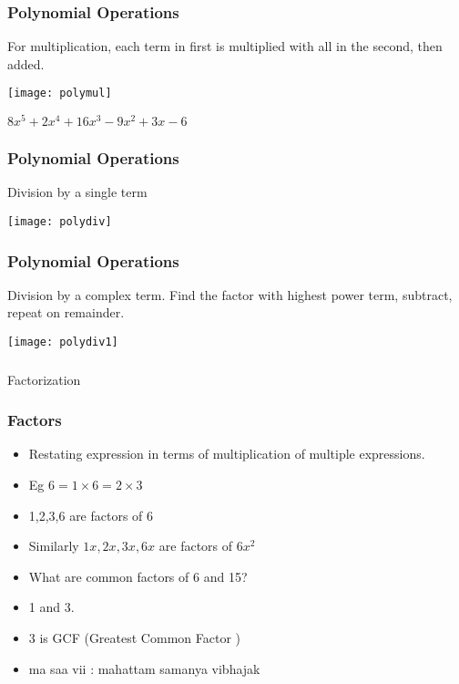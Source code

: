  \begin{frame}[fragile]\frametitle{Polynomial Operations}
For multiplication, each term in first is multiplied with all in the second, then added.
\begin{center}
\texttt{[image: polymul]}
\end{center}
$8x^5 + 2x^4 + 16x^3-9x^2+3x-6$
\end{frame}

 \begin{frame}[fragile]\frametitle{Polynomial Operations}
Division by a single term
\begin{center}
\texttt{[image: polydiv]}
\end{center}
\end{frame}

 \begin{frame}[fragile]\frametitle{Polynomial Operations}
Division by a complex term. Find the factor with highest power term, subtract, repeat on remainder.
\begin{center}
\texttt{[image: polydiv1]}
\end{center}
\end{frame}

\begin{frame}[fragile]\frametitle{}
\begin{center}
{\Large Factorization}
\end{center}
\end{frame}



 \begin{frame}[fragile]\frametitle{Factors}
\begin{itemize}
\item Restating expression in terms of multiplication of multiple expressions.
\item Eg $6 = 1 \times 6 = 2 \times 3$
\item 1,2,3,6 are factors of 6
\item Similarly $1x,2x,3x,6x$ are factors of $6x^2$
\item What are common factors of 6 and 15?
\item 1 and 3. 
\item 3 is GCF  (Greatest Common Factor )
\item ma saa vii : mahattam samanya vibhajak
\end{itemize}
\end{frame}

